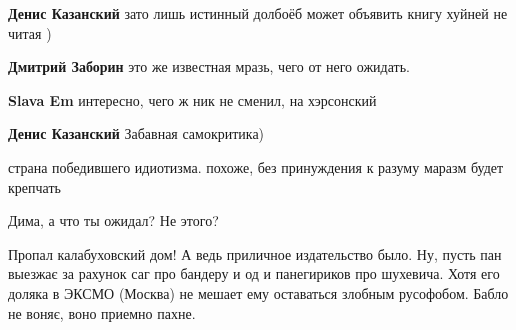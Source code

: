 \begin{itemize}
\begin{itemize} %
\textbf{Денис Казанский} зато лишь истинный долбоёб может объявить книгу хуйней не читая )

\textbf{Дмитрий Заборин} это же известная мразь, чего от него ожидать.

\textbf{Slava Em} интересно, чего ж ник не сменил, на хэрсонский

\textbf{Денис Казанский} Забавная самокритика)
\end{itemize} %

страна победившего идиотизма. похоже, без принуждения к разуму маразм будет крепчать

Дима, а что ты ожидал? Не этого?


\obeycr
Пропал калабуховский дом!
А ведь приличное издательство было.
Ну, пусть пан выезжає за рахунок саг про бандеру и од и панегириков про шухевича.
Хотя его доляка в ЭКСМО (Москва) не мешает ему оставаться злобным русофобом.
Бабло не воняє, воно приемно пахне.
\restorecr

\end{itemize} %
